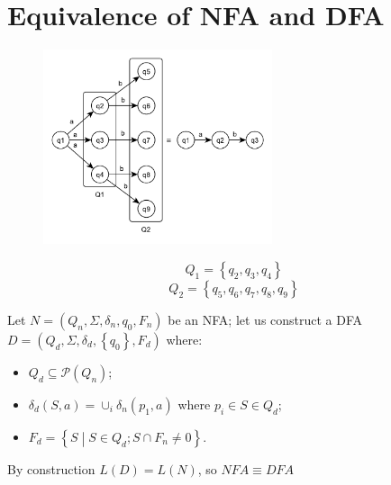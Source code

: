 \section{Equivalence of NFA and DFA}
\begin{figure}[H]
    \centerline{\includegraphics[width=0.6\textwidth]{img/1.pdf}}
\end{figure}
$$
	Q_1 = \left\{q_2, q_3, q_4\right\}
$$
$$
	Q_2 = \left\{q_5, q_6, q_7, q_8, q_9\right\}
$$

Let $N = (Q_n, \Sigma, \delta_n, q_0, F_n)$ be an NFA; let us construct a DFA $D = (Q_d, \Sigma, \delta_d, \left\{q_0\right\}, F_d)$ where:
\begin{itemize}
	\item $Q_d \subseteq \mathscr{P}(Q_n)$;
	\item $\delta_d(S, a) = \cup_i \delta_n(p_1, a)$ where $p_i \in S \in Q_d$;
	\item $F_d = \left\{S \middle| S \in Q_d; S \cap F_n \neq 0 \right\}$.
\end{itemize}
By construction $L(D) = L(N)$, so $NFA \equiv DFA$

